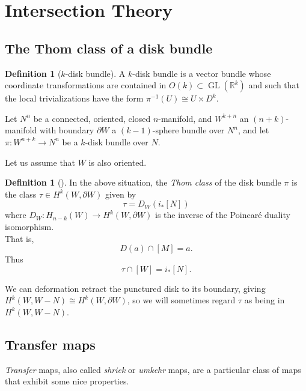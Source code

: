 \documentclass[reqno]{amsart}
\theoremstyle{definition}
\newtheorem{definition}[theorem]{Definition}
\theoremstyle{remark}
\DeclareMathOperator{\GL}{GL}
\begin{document}
      



      


\section{Intersection Theory}

\subsection{The Thom class of a disk bundle}

\begin{definition}[$k$-disk bundle]
    A $k$-disk bundle is a vector bundle whose
    coordinate transformations are contained in
    $O(k) \subset \GL (\mathbb{R}^{k})$ and such that
    the local trivializations have the form
    $\pi^{-1}(U) \cong U \times D^{k}$.
    \todo{}
\end{definition}

Let $N^{n}$ be a connected, oriented, closed $n$-manifold, and
$W^{k+n}$ an $(n+k)$-manifold with boundary
$\partial W$ a $(k-1)$-sphere bundle over $N^{n}$, and let
$\pi \colon W^{n+k} \to N^{n}$ be a $k$-disk bundle over $N$.

Let us assume that $W$ is also oriented.

\begin{definition}[]
    In the above situation, the \textit{Thom class} of the
    disk bundle $\pi$ is the class $\tau \in 
    H^{k}\left( W, \partial W \right) $ given by
    \[
    \tau = D_W \left( i_* \left[ N \right]  \right) 
    \] 
    where $D_W \colon H_{n-k} (W) \to H^{k}(W, \partial W)$ is
    the inverse of the Poincaré duality isomorphism.\\
    That is,
    \[
    D(a) \cap \left[ M \right]  = a.
    \] 
    Thus
    \[
    \tau \cap \left[ W \right] =
    i_* \left[ N \right] .
    \] 
\end{definition}

We can deformation retract the punctured disk to its boundary, giving
$H^{k}(W, W-N) \cong H^{k}(W, \partial W)$\todo{}, so we will
sometimes regard
$\tau$ as being in $H^{k}(W, W-N)$.


\subsection{Transfer maps}

\textit{Transfer} maps, also called \textit{shriek} or
\textit{umkehr} maps, are a particular class of maps that exhibit 
some nice properties. 
\end{document}

